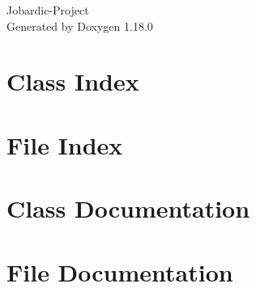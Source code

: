 \documentclass[twoside]{book}
\newcommand{\+}{\discretionary{\mbox{\scriptsize$\hookleftarrow$}}{}{}}
\newcommand{\clearemptydoublepage}{%
    \newpage{\pagestyle{empty}\cleardoublepage}%
  }
\begin{document}
  \raggedbottom
    \hypersetup{pageanchor=false,
                bookmarksnumbered=true,
                pdfencoding=unicode
               }
  \begin{titlepage}
  \vspace*{7cm}
  \begin{center}%
  {\Large Jobardic-\/\+Project}\\
  \vspace*{1cm}
  {\large Generated by Doxygen 1.18.0}\\
  \end{center}
  \end{titlepage}
  \clearemptydoublepage
  \tableofcontents
  \clearemptydoublepage
  \hypersetup{pageanchor=true}
\chapter{Class Index}

\chapter{File Index}

\chapter{Class Documentation}




\chapter{File Documentation}





  \backmatter
  \newpage
  \clearemptydoublepage
  \printindex
\end{document}
